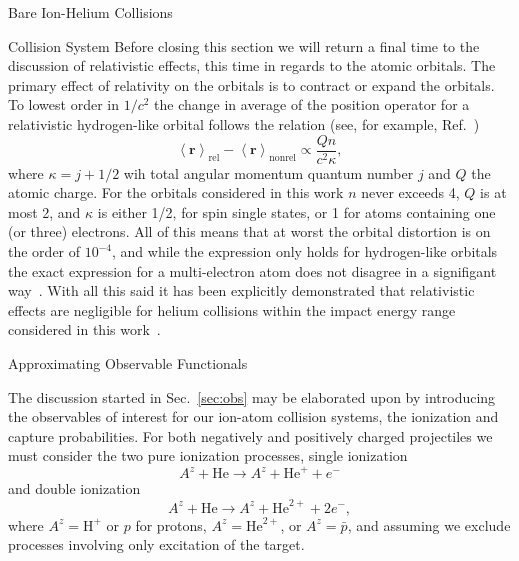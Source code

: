 \documentclass[letterpaper, 11 pt]{report}
\begin{document}
\begin{chapter}{Bare Ion-Helium Collisions \label{chap:p-he2p-he}}
\begin{section}{Collision System \label{sec:p-he2p-he-sys}}
      Before closing this section we will return a final time to the discussion of relativistic effects,
      this time in regards to the atomic orbitals. The primary effect of relativity on the orbitals is
      to contract or expand the orbitals. To lowest order in $1/c^2$ the change in average of the
      position operator for a relativistic hydrogen-like orbital follows the relation (see, for example,
      Ref.~\cite{relorb})
      \begin{equation} \label{eq:radDiff}
         \left< \mathbf{r} \right>_\mathrm{rel}
       - \left< \mathbf{r} \right>_\mathrm{nonrel} \propto \frac{Q n}{c^2 \kappa},
      \end{equation}
      where $\kappa = j + 1/2$ wih total angular momentum quantum number $j$ and $Q$ the atomic charge.
      For the orbitals considered in this work $n$ never exceeds 4, $Q$ is at most 2, and $\kappa$ is
      either 1/2, for spin single states, or 1 for atoms containing one (or three) electrons. All of
      this means that at worst the orbital distortion is on the order of $10^{-4}$, and while the
      expression only holds for hydrogen-like orbitals the exact expression for a multi-electron atom
      does not disagree in a signifigant way~\cite{relorb}. With all this said it has been explicitly
      demonstrated that relativistic effects are negligible for helium collisions within the impact
      energy range considered in this work~\cite{relCollision}.

   \end{section}

   \begin{section}{Approximating Observable Functionals \label{sec:phe2p-obs}}

      The discussion started in Sec.~\ref{sec:obs} may be elaborated upon by introducing the observables
      of interest for our ion-atom collision systems, the ionization and capture probabilities. For both
      negatively and positively charged projectiles we must consider the two pure ionization processes,
      single ionization
      \begin{equation} \label{eq:TI}
         A^z + \mathrm{He} \rightarrow A^z + \mathrm{He}^+ + e^-
      \end{equation}
      and double ionization
      \begin{equation} \label{eq:II}
         A^z + \mathrm{He} \rightarrow A^z + \mathrm{He}^{2+} + 2e^-,
      \end{equation}
      where $A^z = \mathrm{H}^+$ or $p$ for protons, $A^z = \mathrm{He}^{2+}$, or $A^z = \bar{p}$, and
      assuming we exclude processes involving only excitation of the target.


\end{section}
\end{chapter}
\end{document}
